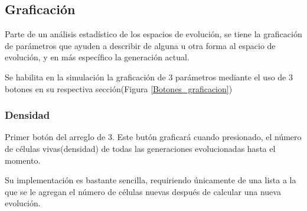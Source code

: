 \documentclass[]{article}
\begin{document}
	\subsection{Graficación}
		Parte de un análisis estadístico de los espacios de evolución, se tiene la graficación de parámetros que ayuden a describir de alguna u otra forma al espacio de evolución, y en más específico la generación actual.
		
		Se habilita en la simulación la graficación de 3 parámetros mediante el uso de 3 botones en su respectiva sección(Figura \ref{Botones_graficacion})
		
		\subsubsection{Densidad}
			Primer botón del arreglo de 3. Este butón graficará cuando presionado, el número de células vivas(densidad) de todas las generaciones evolucionadas hasta el momento.
			
			Su implementación es bastante sencilla, requiriendo únicamente de una lista a la que se le agregan el número de células nuevas después de calcular una nueva evolución.
			
\end{document}
